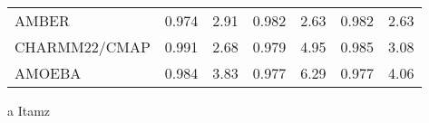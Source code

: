 \begin{table}[h]
\begin{center}
\begin{threeparttable}
\begin{tabular}{l r r r r r r}
AMBER          & 0.974  & 2.91  &  0.982   &2.63  &  0.982   &2.63\\
CHARMM22/CMAP  & 0.991  & 2.68  &  0.979   &4.95  &  0.985   &3.08\\
AMOEBA         & 0.984  & 3.83  &  0.977   &6.29  &  0.977   &4.06\\
    \end{tabular}
    \begin{tablenotes}
        \item[a] Itamz\\
    \end{tablenotes}
    \end{threeparttable}
    \end{center}
    \label{tab:procs_results}
\end{table}






